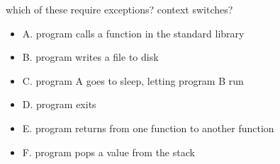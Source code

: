 \begin{frame}{which of these require exceptions? context switches?}
    \begin{itemize}
    \item A. program calls a function in the standard library
    \item B. program writes a file to disk
    \item C. program A goes to sleep, letting program B run
    \item D. program exits
    \item E. program returns from one function to another function
    \item F. program pops a value from the stack
    \end{itemize}
\end{frame}

